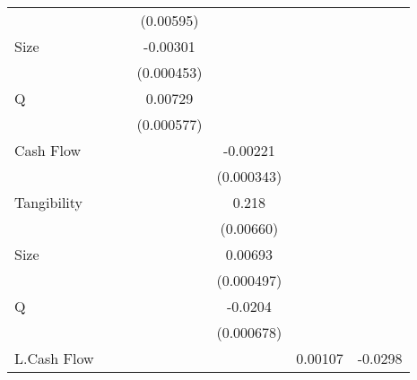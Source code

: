 {\begin{tabular}{l*{6}{c}}
                    &                     &                     &   (0.00595)         &                     &                     &                     \\
[1em]
Size                &                     &                     &    -0.00301\sym{***}&                     &                     &                     \\
                    &                     &                     &  (0.000453)         &                     &                     &                     \\
[1em]
Q                   &                     &                     &     0.00729\sym{***}&                     &                     &                     \\
                    &                     &                     &  (0.000577)         &                     &                     &                     \\
[1em]
Cash Flow           &                     &                     &                     &    -0.00221\sym{***}&                     &                     \\
                    &                     &                     &                     &  (0.000343)         &                     &                     \\
[1em]
Tangibility         &                     &                     &                     &       0.218\sym{***}&                     &                     \\
                    &                     &                     &                     &   (0.00660)         &                     &                     \\
[1em]
Size                &                     &                     &                     &     0.00693\sym{***}&                     &                     \\
                    &                     &                     &                     &  (0.000497)         &                     &                     \\
[1em]
Q                   &                     &                     &                     &     -0.0204\sym{***}&                     &                     \\
                    &                     &                     &                     &  (0.000678)         &                     &                     \\
[1em]
L.Cash Flow         &                     &                     &                     &                     &     0.00107         &     -0.0298\sym{***}\\

\end{tabular}}
